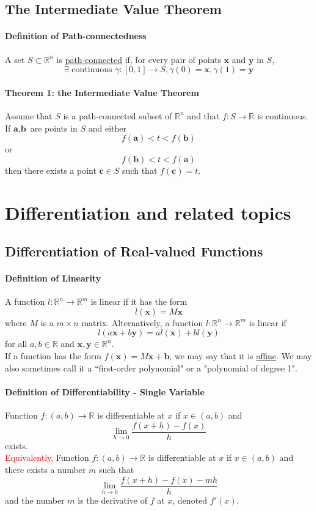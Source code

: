 \documentclass[11pt]{article}
\newcommand{\tb}[1]{\textbf{#1}}
\newcommand{\real}[0]{\mathbb{R}}
\newcommand{\under}[1]{\underline{#1}}
\newcommand{\vx}[0]{\tb{x}}
\newcommand{\vy}[0]{\tb{y}}
\newcommand{\va}[0]{\tb{a}}
\newcommand{\vb}[0]{\tb{b}}
\newcommand{\vc}[0]{\tb{c}}
\begin{document}
\subsection{The Intermediate Value Theorem}
\paragraph{Definition of Path-connectedness} A set $S \subset \real^n$ is \under{path-connected} if, for every pair of points $\vx$ and $\vy$ in $S$,
$$\exists \mbox{ continuous } \gamma: [0,1] \rightarrow S, \gamma(0) = \vx, \gamma(1) = \vy$$
\paragraph{Theorem 1: the Intermediate Value Theorem} Assume that $S$ is a path-connected subset of $\real^n$ and that $f: S \rightarrow \real$ is continuous. If $\va, \vb$ are points in $S$ and either
$$f(\va) < t < f(\vb)$$ or
$$f(\vb) < t < f(\va)$$
then there exists a point $\vc \in S$ such that $f(\vc) = t$. 

\section{Differentiation and related topics}
\subsection{Differentiation of Real-valued Functions}
\paragraph{Definition of Linearity}
A function $l: \real^n \rightarrow \real^m$ is linear if it has the form
$$l(\vx) = M\vx$$
where $M$ is a $m \times n$ matrix.
Alternatively, a function $l: \real^n \rightarrow \real^m$ is linear if
$$l(a\vx + b\vy) = al(\vx) + bl(\vy)$$
for all $a,b \in \real$ and $\vx, \vy \in \real^n$. \\
If a function has the form $f(\vx) = M\vx + \vb$, we may say that it is \under{affine}. We may also sometimes call it a ``first-order polynomial" or a "polynomial of degree 1".
\paragraph{Definition of Differentiability - Single Variable}
Function $f: (a,b) \rightarrow \real$ is differentiable at $x$ if $x \in (a,b)$ and
$$\underset{h\rightarrow 0}{\lim}\frac{f(x+h) - f(x)}{h}$$ exists. \\
\textcolor{red}{Equivalently,}
Function $f: (a,b) \rightarrow \real$ is differentiable at $x$ if $x \in (a,b)$ and there exists a number $m$ such that
$$\underset{h\rightarrow 0}{\lim}\frac{f(x+h) - f(x) - mh}{h}$$
and the number $m$ is the derivative of $f$ at $x$, denoted $f'(x)$.\\
\end{document}
